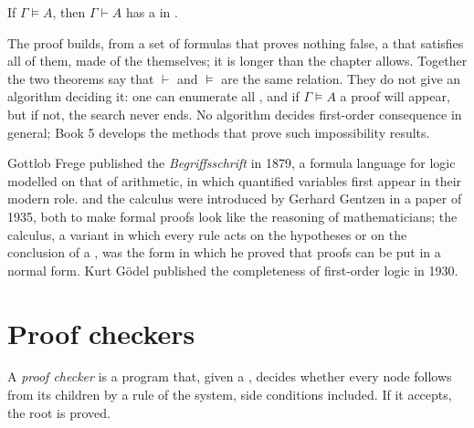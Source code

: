 \begin{theorem}[Completeness]\label{thm:b2:predicate-logic:completeness}
If $\Gamma \models A$, then $\Gamma \vdash A$ has a  in .
\end{theorem}

\admitted

The proof builds, from a set of formulas that proves nothing false, a  that satisfies all of them, made of the
 themselves; it is longer than the chapter allows. Together the two theorems say that $\vdash$ and $\models$ are
the same relation. They do not give an algorithm deciding it: one can enumerate all , and if $\Gamma \models
A$ a proof will appear, but if not, the search never ends. No algorithm decides first-order consequence in general; Book 5
develops the methods that prove such impossibility results.

\begin{history}
Gottlob Frege published the \emph{Begriffsschrift} in 1879, a formula language for logic modelled on that of
arithmetic, in which quantified variables first appear in their modern role.  and the  calculus
were introduced by Gerhard Gentzen in a paper of 1935, both to make formal proofs look like the reasoning of
mathematicians; the  calculus, a variant in which every rule acts on the hypotheses or on the conclusion of a
, was the form in which he proved that proofs can be put in a normal form. Kurt Gödel published the completeness
of first-order logic in 1930.
\end{history}

\section{Proof checkers}\label{sec:b2:predicate-logic:checkers}

\begin{definition}\label{def:b2:predicate-logic:checker}
A \emph{proof checker} is a program that, given a , decides whether every node follows
from its children by a rule of the system, side conditions included. If it accepts, the root  is proved.
\end{definition}

